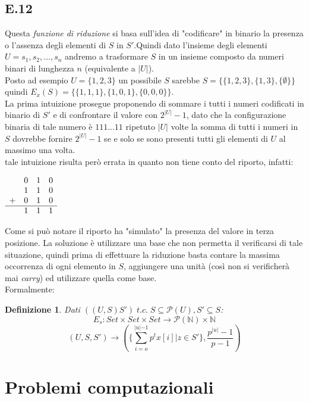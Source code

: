 \documentclass[a4paper]{article}
\newtheorem*{definition}{Definizione}
\begin{document}
\subsection{E.12}
Questa \textit{funzione di riduzione} si basa sull'idea di "codificare" in binario la presenza o l'assenza degli elementi di $S$ in $S'$.Quindi dato l'insieme degli elementi $U={s_1, s_2,...,s_n}$ andremo a trasformare $S$ in un insieme composto da numeri binari di lunghezza $n$ (equivalente a $|U|$).\\
Posto ad esempio $U = \{1,2,3\}$ un possibile $S$ sarebbe $S= \{\{1,2,3\},\{1,3\},\{\emptyset\}\}$ quindi $E_x(S) = \{\{1,1,1\},\{1,0,1\},\{0,0,0\}\}$.\\
La prima intuizione prosegue proponendo di sommare i tutti i numeri codificati in binario di $S'$ e di confrontare il valore con $2^{|U|}-1$, dato che la configurazione binaria di tale numero è $111...11$ ripetuto $|U|$ volte la somma di tutti i numeri in $S$ dovrebbe fornire $2^{|U|}-1$ se e solo se sono presenti tutti gli elementi di $U$ al massimo una volta.\\
tale intuizione risulta però errata in quanto non tiene conto del riporto, infatti:
\begin{center}$\begin{array}{llll}
  & 0 & 1  & 0  \\ %
  & 1 & 1  & 0  \\	%
+ &  0 & 1  & 0  \\ %
\hline
  &  1 & 1  & 1  \\ %
\end{array}$
\end{center}
Come si può notare il riporto ha "simulato" la presenza del valore in terza posizione.
La soluzione è utilizzare una base che non permetta il verificarsi di tale situazione, quindi prima di effettuare la riduzione basta contare la massima occorrenza di ogni elemento in $S$, aggiungere una unità (così non si verificherà mai \textit{carry}) ed utilizzare quella come base.
\\Formalmente:
\begin{definition}
	Dati $((U,S)S') \; t.c. \; S \subseteq \mathcal{P}(U), S' \subseteq S$:
	$$ E_s: Set \times Set \times Set \rightarrow \mathcal{P}(\mathbb{N}) \times \mathbb{N}$$
	$$(U,S,S') \rightarrow (\{\sum_{i=o}^{\rvert u \lvert -1} p^tx[i] | z \in S'\}, \frac{p^{\rvert u \lvert} -1}{p -1})$$
\end{definition}
\section{Problemi computazionali}
\end{document}
